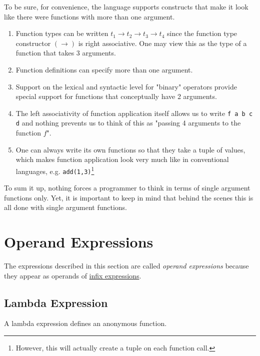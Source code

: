 To be sure, for convenience, the language supports constructs that make it look like there were functions with more than one argument.
\begin{enumerate}
\item Function types can be written $t_1 \rightarrow{} t_2 \rightarrow{} t_3 \rightarrow{} t_4$ since the function type constructor $(\rightarrow)$ is right associative. One may view this as the type of a function that takes 3 arguments.
\item Function definitions can specify more than one argument.
\item Support on the lexical and syntactic level for "binary" operators provide special support for functions that conceptually have 2 arguments.
\item The left associativity of function application itself allows us to write \texttt{f a b c d} and nothing prevents us to think of this as "passing 4 arguments to the function $f$".
\item One can always write its own functions so that they take a tuple of values, which makes function application look very much like in conventional languages, e.g. \texttt{add(1,3)}\footnote{However, this will actually create a tuple on each function call.}
\end{enumerate}

To sum it up, nothing forces a \frege{} programmer to think in terms of single argument functions only.
Yet, it is important to keep in mind that behind the scenes this is all done with single argument functions.


\section{Operand Expressions} \label{topex}

The expressions described in this section are called \emph{operand expressions} because they appear as operands of \hyperref[binex]{infix expressions}.

\subsection{Lambda Expression} \label{lambda}

A lambda expression defines an anonymous function.

